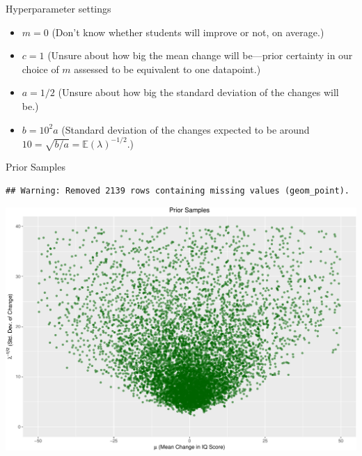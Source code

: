 \documentclass[
  ignorenonframetext,
]{beamer}
\newcommand{\E}{\mathbb{E}}
\begin{document}
\begin{frame}{Hyperparameter settings}
\protect\hypertarget{hyperparameter-settings}{}

\begin{itemize}
\item $m = 0$ (Don't know whether students will improve or not, on average.)
\item $c = 1$ (Unsure about how big the mean change will be---prior certainty in our choice of $m$ assessed to be equivalent to one datapoint.)
\item $a = 1/2$ (Unsure about how big the standard deviation of the changes will be.)
\item $b = 10^2 a$ (Standard deviation of the changes expected to be around $10 = \sqrt{b/a} = \E(\lambda)^{-1/2}$.)
\end{itemize}

\end{frame}

\begin{frame}[fragile]{Prior Samples}
\protect\hypertarget{prior-samples}{}

\begin{verbatim}
## Warning: Removed 2139 rows containing missing values (geom_point).
\end{verbatim}

\includegraphics{04-normal-gamma_files/figure-beamer/unnamed-chunk-6-1.pdf}

\end{frame}
\end{document}
